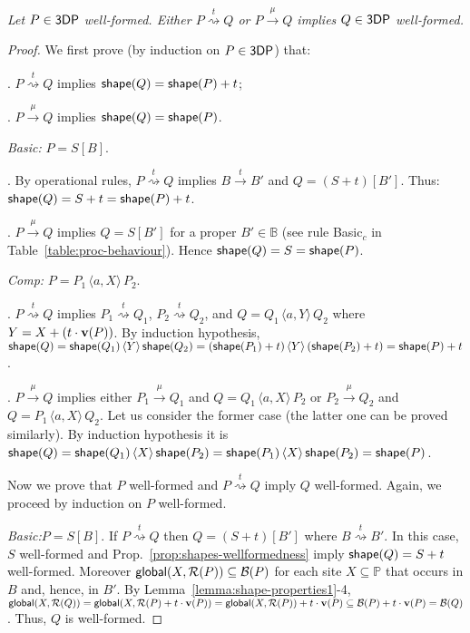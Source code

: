 \documentclass[11pt]{article}
\newcommand{\reference}{{\sf global}}
\newcommand{\proc}{\sf{3DP}}
\newcommand{\bpa}{\mathbb{B}}
\newcommand{\union}[1]{\ensuremath{\,\langle #1 \rangle\,}}
\newcommand{\unionc}[1]{\,\langle #1 \rangle\,}
\newcommand{\nar}[1]{\xrightarrow{#1}}
\newcommand{\wnar}[1]{\stackrel{#1}{\rightsquigarrow}}
\newcommand{\pos}{{\mathbb P}}
\def\name#1{\mbox{\sc #1}}
\newcommand{\shape}{{\sf shape}}
\newcommand{\boundary}[1]{\ensuremath{{\cal B}(#1)}}
\newcommand{\velocity}[1]{{\bf v}(#1)}
\newcommand{\referencepoint}[1]{\ensuremath{{\cal R}(#1)}}
\begin{document}
\par\medskip{}
\em Let $P \in \proc$ well-formed. Either $P \wnar{t} Q$ or $P \nar{\mu}{} Q$ implies $Q \in \proc$
well-formed.\rm

\smallskip\noindent\begin{proof}
We first prove (by induction on $P\in \proc$) that:

\par\medskip{}. $P \wnar{t} Q$ implies $\shape(Q) = \shape(P) + t $;

\par\medskip{}. $P \nar{\mu} Q$ implies $\shape(Q) = \shape(P)$.

\par\medskip\noindent
{\em Basic:} $ P = S[B] $.

. By operational rules, $P \wnar{t} Q$ implies $B \nar{t} B'$ and $Q= (S+t)[B']$. Thus:
$\shape(Q) = S+t = \shape(P) + t$.

. $P \nar{\mu} Q$ implies $Q= S[B']$ for a proper $B'\in \bpa$ (see rule \name{Basic$_c$}
in Table~\ref{table:proc-behaviour}). Hence $\shape(Q) = S = \shape(P)$.

\par\bigskip\noindent
{\em Comp:} $ P = P_1 \unionc{a,X} P_2$.

. $P \wnar{t} Q$ implies $P_1 \wnar{t} Q_1$, $P_2 \wnar{t} Q_2$, and $Q= Q_1
\unionc{a, Y} Q_2$ where $Y = X + (t \cdot \velocity{P})$.
By induction hypothesis,  $\shape(Q) = \shape(Q_1) \union{Y}
\shape(Q_2) = (\shape(P_1)+t) \union{Y} (\shape(P_2)  + t) = \shape(P) + t$.

. $P \nar{\mu} Q$ implies either $P_1 \nar{\mu} Q_1$ and $Q= Q_1
\unionc{a,X} P_2$ or $P_2
\nar{\mu} Q_2$ and $Q= P_1 \unionc{a,X} Q_2$. Let us consider the former case
(the latter one can be proved similarly). By induction hypothesis it is $\shape(Q) =
\shape(Q_1) \union{X} \shape(P_2) = \shape(P_1) \union{X} \shape(P_2)  = \shape(P)$.

\par\medskip\noindent
Now we prove that $P$ well-formed and $P \wnar{t} Q$ imply $Q$ well-formed. Again, we proceed by
induction on $P$ well-formed.
\par\medskip\noindent
{\em Basic:}$ P = S[B] $. If $P \wnar{t} Q$ then $Q= (S+t)[B']$ where $B \wnar{t} B'$. In this
case, $S$ well-formed and Prop.~\ref{prop:shapes-wellformedness}
imply $\shape(Q) = S + t$ well-formed. Moreover $\reference(X, \referencepoint{P}) \subseteq
\boundary{P}$ for each site $X \subseteq \pos$ that occurs in $B$ and, hence, in $B'$. By
Lemma~\ref{lemma:shape-properties1}-4,  $\reference(X, \referencepoint{Q}) = \reference(X,
\referencepoint{P} + t \cdot \velocity{P}) = \reference(X, \referencepoint{P})  + t \cdot
\velocity{P} \subseteq \boundary{P} + t\cdot \velocity{P} = \boundary{Q}$. Thus,  $Q$
is well-formed.


\end{proof}
\end{document}
